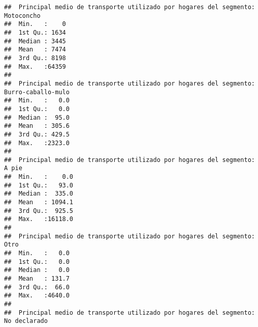 \documentclass[11pt,]{article}
\begin{document}
\begin{verbatim}
##  Principal medio de transporte utilizado por hogares del segmento: Motoconcho
##  Min.   :    0                                                               
##  1st Qu.: 1634                                                               
##  Median : 3445                                                               
##  Mean   : 7474                                                               
##  3rd Qu.: 8198                                                               
##  Max.   :64359                                                               
##                                                                              
##  Principal medio de transporte utilizado por hogares del segmento: Burro-caballo-mulo
##  Min.   :   0.0                                                                      
##  1st Qu.:   0.0                                                                      
##  Median :  95.0                                                                      
##  Mean   : 305.6                                                                      
##  3rd Qu.: 429.5                                                                      
##  Max.   :2323.0                                                                      
##                                                                                      
##  Principal medio de transporte utilizado por hogares del segmento: A pie
##  Min.   :    0.0                                                        
##  1st Qu.:   93.0                                                        
##  Median :  335.0                                                        
##  Mean   : 1094.1                                                        
##  3rd Qu.:  925.5                                                        
##  Max.   :16118.0                                                        
##                                                                         
##  Principal medio de transporte utilizado por hogares del segmento: Otro
##  Min.   :   0.0                                                        
##  1st Qu.:   0.0                                                        
##  Median :   0.0                                                        
##  Mean   : 131.7                                                        
##  3rd Qu.:  66.0                                                        
##  Max.   :4640.0                                                        
##                                                                        
##  Principal medio de transporte utilizado por hogares del segmento: No declarado

\end{verbatim}
\end{document}
